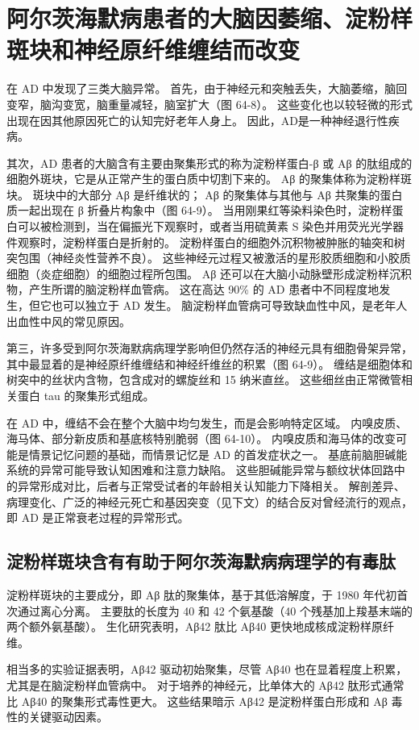 \section{阿尔茨海默病患者的大脑因萎缩、淀粉样斑块和神经原纤维缠结而改变}
在 AD 中发现了三类大脑异常。 首先，由于神经元和突触丢失，大脑萎缩，脑回变窄，脑沟变宽，脑重量减轻，脑室扩大（图 64-8）。 这些变化也以较轻微的形式出现在因其他原因死亡的认知完好老年人身上。 因此，AD是一种神经退行性疾病。

其次，AD 患者的大脑含有主要由聚集形式的称为淀粉样蛋白-β 或 Aβ 的肽组成的细胞外斑块，它是从正常产生的蛋白质中切割下来的。 Aβ 的聚集体称为淀粉样斑块。 斑块中的大部分 Aβ 是纤维状的； Aβ 的聚集体与其他与 Aβ 共聚集的蛋白质一起出现在 β 折叠片构象中（图 64-9）。 当用刚果红等染料染色时，淀粉样蛋白可以被检测到，当在偏振光下观察时，或者当用硫黄素 S 染色并用荧光光学器件观察时，淀粉样蛋白是折射的。 淀粉样蛋白的细胞外沉积物被肿胀的轴突和树突包围（神经炎性营养不良）。 这些神经元过程又被激活的星形胶质细胞和小胶质细胞（炎症细胞）的细胞过程所包围。 Aβ 还可以在大脑小动脉壁形成淀粉样沉积物，产生所谓的脑淀粉样血管病。 这在高达 90\% 的 AD 患者中不同程度地发生，但它也可以独立于 AD 发生。 脑淀粉样血管病可导致缺血性中风，是老年人出血性中风的常见原因。

第三，许多受到阿尔茨海默病病理学影响但仍然存活的神经元具有细胞骨架异常，其中最显着的是神经原纤维缠结和神经纤维丝的积累（图 64-9）。 缠结是细胞体和树突中的丝状内含物，包含成对的螺旋丝和 15 纳米直丝。 这些细丝由正常微管相关蛋白 tau 的聚集形式组成。

在 AD 中，缠结不会在整个大脑中均匀发生，而是会影响特定区域。 内嗅皮质、海马体、部分新皮质和基底核特别脆弱（图 64-10）。 内嗅皮质和海马体的改变可能是情景记忆问题的基础，而情景记忆是 AD 的首发症状之一。 基底前脑胆碱能系统的异常可能导致认知困难和注意力缺陷。 这些胆碱能异常与额纹状体回路中的异常形成对比，后者与正常受试者的年龄相关认知能力下降相关。 解剖差异、病理变化、广泛的神经元死亡和基因突变（见下文）的结合反对曾经流行的观点，即 AD 是正常衰老过程的异常形式。

\subsection{淀粉样斑块含有有助于阿尔茨海默病病理学的有毒肽}
淀粉样斑块的主要成分，即 Aβ 肽的聚集体，基于其低溶解度，于 1980 年代初首次通过离心分离。 主要肽的长度为 40 和 42 个氨基酸（40 个残基加上羧基末端的两个额外氨基酸）。 生化研究表明，Aβ42 肽比 Aβ40 更快地成核成淀粉样原纤维。

相当多的实验证据表明，Aβ42 驱动初始聚集，尽管 Aβ40 也在显着程度上积累，尤其是在脑淀粉样血管病中。 对于培养的神经元，比单体大的 Aβ42 肽形式通常比 Aβ40 的聚集形式毒性更大。 这些结果暗示 Aβ42 是淀粉样蛋白形成和 Aβ 毒性的关键驱动因素。

